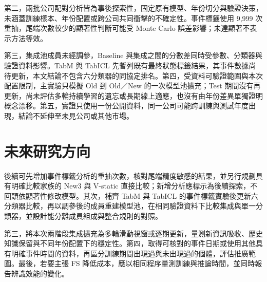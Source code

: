 第二，兩批公司配對分析皆為事後探索性，固定原有模型、年份切分與驗證決策，未涵蓋訓練樣本、年份配置或跨公司共同衝擊的不確定性。事件標籤使用 9,999 次重抽，尾端次數較少的顯著性判斷可能受 Monte Carlo 誤差影響；未達顯著不表示方法等效。

第三，集成池成員未經調參，Baseline 與集成之間的分數差同時受參數、分類器與驗證資料影響。TabM 與 TabICL 先暫列既有最終狀態標籤結果，其事件數據尚待更新，本文結論不包含六分類器的同協定排名。第四，受資料可驗證範圍與本次配置限制，主實驗只模擬 Old 到 Old／New 的一次模型池擴充；Test 期間沒有再更新，尚未評估多輪持續學習的遺忘或長期線上適應，也沒有由年份差異單獨證明概念漂移。第五，實證只使用一份公開資料，同一公司可能跨訓練與測試年度出現，結論不延伸至未見公司或其他市場。

\section{未來研究方向}

後續可先增加事件標籤分析的重抽次數，核對尾端精度敏感的結果，並另行規劃具有明確比較家族的 New3 與 V-static 直接比較；新增分析應標示為後續探索，不回頭依顯著性修改模型。其次，補齊 TabM 與 TabICL 的事件標籤實驗後更新六分類器比較，再以調參後的成員重建模型池，在相同驗證資料下比較集成與單一分類器，並設計能分離成員組成與整合規則的對照。

第三，將本次兩階段集成擴充為多輪滑動視窗或逐期更新，量測新資訊吸收、歷史知識保留與不同年份配置下的穩定性。第四，取得可核對的事件日期或使用其他具有明確事件時間的資料，再區分訓練期間出現過與未出現過的個體，評估推廣範圍。最後，若要主張 FS 降低成本，應以相同程序量測訓練與推論時間，並同時報告辨識效能的變化。
\endgroup
